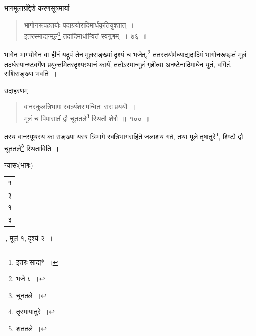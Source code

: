 \documentclass[10pt, openany]{book}
\begin{document}
{{{भागमूलाग्रोद्देशे करणसूत्रमार्या\textemdash}

 \label{76}
\begin{quote}
    
{\bs भागोनरूपहतयोः पदाग्रयोरादिमार्धकृतियुक्तात्~। \\
 इतरस्माद्यन्मूलं\renewcommand{\thefootnote}{\s ४}\footnote{\s इतरः साद्य*~।} तदादिमार्धान्वितं स्वगुणम्~॥~७६~॥}\end{quote}

{भागेन भागयोगेन वा हीनं यद्रूपं तेन मूलसङ्ख्यां दृश्यं च भजेत्,\renewcommand{\thefootnote}{\s ५}\footnote{\s भजे ८~।}
ततस्तयोर्मध्याद्यदादिमं भागोनरूपहृतं मूलं तदर्धस्यानष्टवर्गेण प्रयुक्तमितरदृश्यस्थानं
कार्यं, ततोऽस्मान्मूलं}
{गृहीत्वा अनष्टेनादिमार्धेन युतं, वर्गितं, राशिसङ्ख्या भवति~।}

\vspace{3mm}
उदाहरणम्\textemdash}

\begin{quote}
    
    {\eg वानरकुलत्रिभागः स्वत्र्यंशसमन्वितः सरः प्रययौ~। \\
 मूलं च पिपासार्तं द्वौ चूततले\renewcommand{\thefootnote}{\s ६}\footnote{\s चूनतले~।} स्थितौ शेषौ~॥~१००~॥}\end{quote}

{तस्य वानरयूथस्य का सङ्ख्या यस्य त्रिभागे स्वत्रिभागसहिते जलाशयं गते,
तथा}
{मूले तृषातुरे\renewcommand{\thefootnote}{\s ७}\footnote{\s तृस्मायातुरे~।}, शिष्टौ द्वौ चूततले\renewcommand{\thefootnote}{\s ८}\footnote{\s शततले~।} स्थिताविति~।}
\vspace{3mm}

{न्यासः\textendash \;(भागः) \begin{tabular}{|c|}१\\ ३\\ १ \\ ३\\\hline \end{tabular}\,,
मूलं १, दृश्यं २~।}
\vspace{3mm}

}
\end{document}
